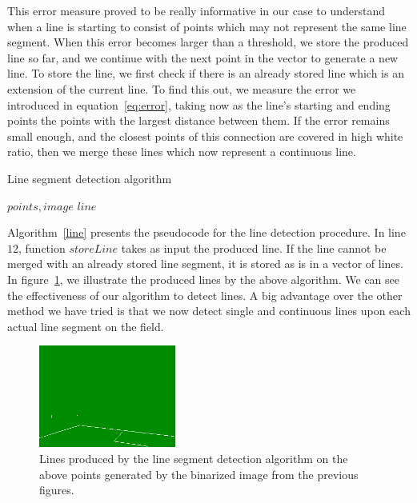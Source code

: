 \documentclass[	DIV=calc,%
							paper=a4,%
							fontsize=9pt,%
							twocolumn]{scrartcl}	 					%
\begin{document}
This error measure proved to be really informative in our case to understand when a line is starting to consist of points which may not represent the same line segment. When this error becomes larger than a threshold, we store the produced line so far, and we continue with the next point in the vector to generate a new line. To store the line, we first check if there is an already stored line which is an extension of the current line. To find this out, we measure the error we introduced in equation~\ref{eq:error}, taking now as the line's starting and ending points the points with the largest distance between them. If the error remains small enough, and the closest points of this connection are covered in high white ratio, then we merge these lines which now represent a continuous line.
\begin{algorithm}[t!]
\caption{Line segment detection algorithm}
\label{line}
\begin{algorithmic}[1]
$points, image$
$line$
\ELSE
{}
\ENDIF
\ENDWHILE
\end{algorithmic}
\end{algorithm}
Algorithm~\ref{line} presents the pseudocode for the line detection procedure. In line $12$, function $storeLine$ takes as input the produced line. If the line cannot be merged with an already stored line segment, it is stored as is in a vector of lines. In figure~\ref{lines}, we illustrate the produced lines by the above algorithm. We can see the effectiveness of our algorithm to detect lines. A big advantage over the other method we have tried is that we now detect single and continuous lines upon each actual line segment on the field.

\begin{figure}[t!]
\caption{Lines produced by the line segment detection algorithm on the above points generated by the binarized image from the previous figures.}
\label{lines}
\centering    
\includegraphics[width=0.4\textwidth]{figures/lines.png}
\end{figure}
\end{document}
